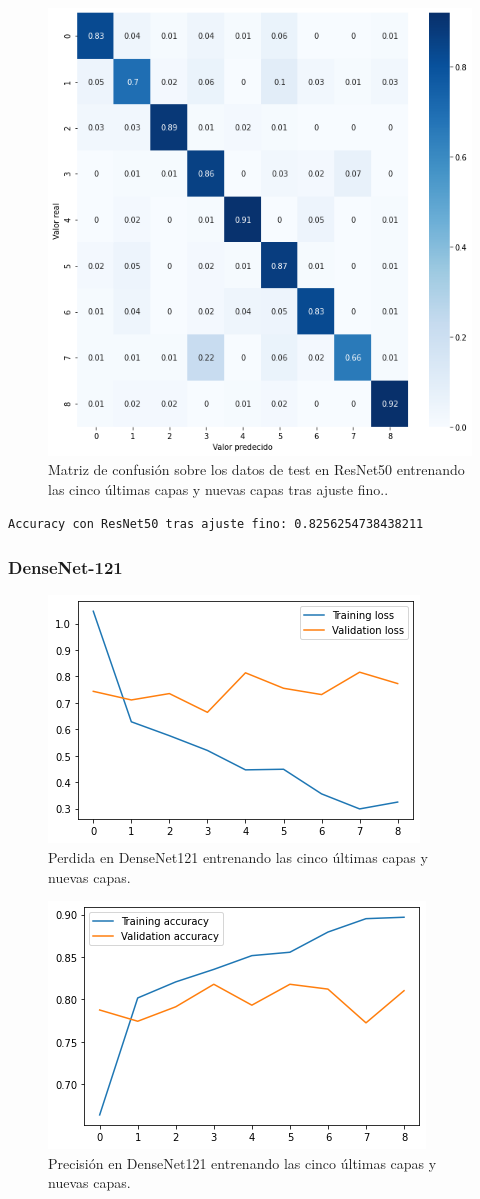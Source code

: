 \begin{figure}[H]
  \centering
  \includegraphics[width=0.5\linewidth]{Imagenes/entrenamiento_redes/5-ult/resnet_5fine_matriz.png}
  \caption{Matriz de confusión sobre los datos de test en ResNet50 entrenando las cinco últimas capas y nuevas capas tras ajuste fino..}
\end{figure}


\begin{lstlisting}
Accuracy con ResNet50 tras ajuste fino: 0.8256254738438211
\end{lstlisting}


\subsubsection{DenseNet-121}

\begin{figure}[H]
  \centering
  \includegraphics[width=0.5\linewidth]{Imagenes/entrenamiento_redes/5-ult/densenet_5ult_loss.png}
  \caption{Perdida en DenseNet121 entrenando las cinco últimas capas y nuevas capas.}
\end{figure}

\begin{figure}[H]
  \centering
  \includegraphics[width=0.5\linewidth]{Imagenes/entrenamiento_redes/5-ult/densenet_5ult_acc.png}
  \caption{Precisión en DenseNet121 entrenando las cinco últimas capas y nuevas capas.}
\end{figure}

